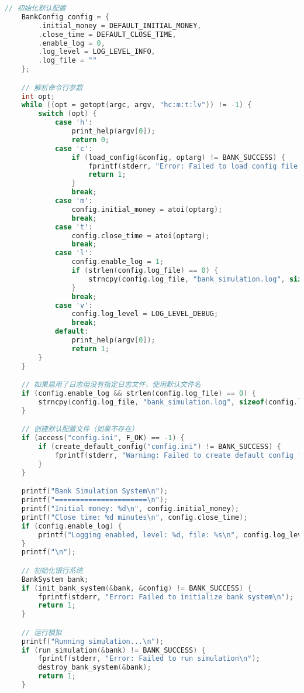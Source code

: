 \documentclass[12pt,a4paper]{article}
\begin{document}
\begin{lstlisting}[language=C,caption=main.c]
    // 初始化默认配置
    BankConfig config = {
        .initial_money = DEFAULT_INITIAL_MONEY,
        .close_time = DEFAULT_CLOSE_TIME,
        .enable_log = 0,
        .log_level = LOG_LEVEL_INFO,
        .log_file = ""
    };

    // 解析命令行参数
    int opt;
    while ((opt = getopt(argc, argv, "hc:m:t:lv")) != -1) {
        switch (opt) {
            case 'h':
                print_help(argv[0]);
                return 0;
            case 'c':
                if (load_config(&config, optarg) != BANK_SUCCESS) {
                    fprintf(stderr, "Error: Failed to load config file %s\n", optarg);
                    return 1;
                }
                break;
            case 'm':
                config.initial_money = atoi(optarg);
                break;
            case 't':
                config.close_time = atoi(optarg);
                break;
            case 'l':
                config.enable_log = 1;
                if (strlen(config.log_file) == 0) {
                    strncpy(config.log_file, "bank_simulation.log", sizeof(config.log_file) - 1);
                }
                break;
            case 'v':
                config.log_level = LOG_LEVEL_DEBUG;
                break;
            default:
                print_help(argv[0]);
                return 1;
        }
    }

    // 如果启用了日志但没有指定日志文件，使用默认文件名
    if (config.enable_log && strlen(config.log_file) == 0) {
        strncpy(config.log_file, "bank_simulation.log", sizeof(config.log_file) - 1);
    }

    // 创建默认配置文件（如果不存在）
    if (access("config.ini", F_OK) == -1) {
        if (create_default_config("config.ini") != BANK_SUCCESS) {
            fprintf(stderr, "Warning: Failed to create default config file\n");
        }
    }

    printf("Bank Simulation System\n");
    printf("======================\n");
    printf("Initial money: %d\n", config.initial_money);
    printf("Close time: %d minutes\n", config.close_time);
    if (config.enable_log) {
        printf("Logging enabled, level: %d, file: %s\n", config.log_level, config.log_file);
    }
    printf("\n");

    // 初始化银行系统
    BankSystem bank;
    if (init_bank_system(&bank, &config) != BANK_SUCCESS) {
        fprintf(stderr, "Error: Failed to initialize bank system\n");
        return 1;
    }

    // 运行模拟
    printf("Running simulation...\n");
    if (run_simulation(&bank) != BANK_SUCCESS) {
        fprintf(stderr, "Error: Failed to run simulation\n");
        destroy_bank_system(&bank);
        return 1;
    }


\end{lstlisting}
\end{document}

